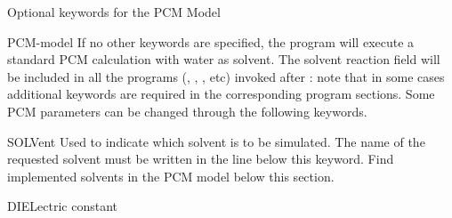 Optional keywords for the PCM Model
\begin{keywordlist}
\item[PCM-model]
If no other keywords are specified, the program will execute a standard PCM calculation
with water as solvent. The solvent reaction field will be included in all the
programs (, , , etc)
invoked after : note that in some cases additional keywords are required
in the corresponding program sections. Some PCM parameters can be changed through the following
keywords.
\item[SOLVent]
Used to indicate which solvent is to be simulated. The name of the requested solvent
must be written in the line below this keyword. Find implemented solvents in the PCM model below this section.
\item[DIELectric constant]

\end{keywordlist}
